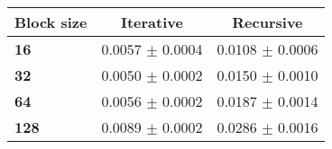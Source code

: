 \begin{tabular}{lcc}\toprule
\textbf{Block size}  & \textbf{Iterative} & \textbf{Recursive}\\\midrule
\textbf{16}  & 0.0057 $\pm$ 0.0004 & 0.0108 $\pm$ 0.0006\\
\textbf{32}  & 0.0050 $\pm$ 0.0002 & 0.0150 $\pm$ 0.0010\\
\textbf{64}  & 0.0056 $\pm$ 0.0002 & 0.0187 $\pm$ 0.0014\\
\textbf{128} & 0.0089 $\pm$ 0.0002 & 0.0286 $\pm$ 0.0016\\
\bottomrule
\end{tabular}
